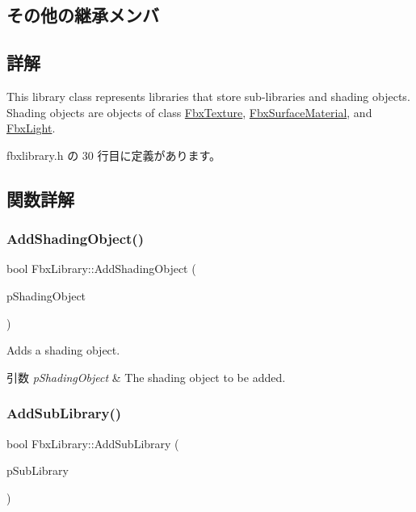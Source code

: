 \subsection*{その他の継承メンバ}


\subsection{詳解}
This library class represents libraries that store sub-\/libraries and shading objects. Shading objects are objects of class \hyperlink{class_fbx_texture}{Fbx\+Texture}, \hyperlink{class_fbx_surface_material}{Fbx\+Surface\+Material}, and \hyperlink{class_fbx_light}{Fbx\+Light}. 

 fbxlibrary.\+h の 30 行目に定義があります。



\subsection{関数詳解}
\mbox{\label{class_fbx_library_a041b82a3689dbf2912d81d0f69218ab7}} 
\subsubsection{\texorpdfstring{Add\+Shading\+Object()}{AddShadingObject()}}
{\footnotesize\ttfamily bool Fbx\+Library\+::\+Add\+Shading\+Object (\begin{DoxyParamCaption}\item[{\hyperlink{class_fbx_object}{Fbx\+Object} $\ast$}]{p\+Shading\+Object }\end{DoxyParamCaption})}

Adds a shading object. 
\begin{DoxyParams}{引数}
{\em p\+Shading\+Object} & The shading object to be added. \\
\hline
\end{DoxyParams}
\mbox{\label{class_fbx_library_a0c3b1e44376fbbad1d85d35aadcedec4}} 
\subsubsection{\texorpdfstring{Add\+Sub\+Library()}{AddSubLibrary()}}
{\footnotesize\ttfamily bool Fbx\+Library\+::\+Add\+Sub\+Library (\begin{DoxyParamCaption}\item[{\hyperlink{class_fbx_library}{Fbx\+Library} $\ast$}]{p\+Sub\+Library }\end{DoxyParamCaption})}

